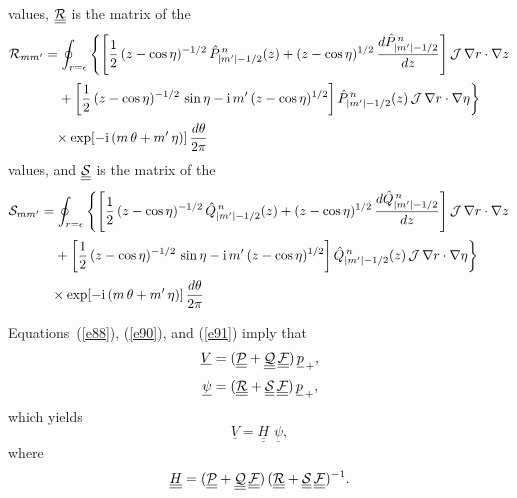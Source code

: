 \documentclass[12pt,prb,aps,notitlepage]{revtex4-1}
\begin{document}
values, $\underline{\underline{{\cal R}}}$ is the matrix of the 
\begin{align}\label{e354}
{\cal R}_{mm'} &=\oint_{r=\epsilon}
\left\{\left[\frac{1}{2}\,(z-\cos\eta)^{-1/2}\,\hat{P}_{|m'|-1/2}^{\,n}(z)+(z-\cos\eta)^{1/2}\,\frac{d\hat{P}_{|m'|-1/2}^{\,n}}{dz}\right]{\cal J}\,\nabla r\cdot \nabla z
\right.\nonumber\\[0.5ex]&
\left.\phantom{=}+\left[\frac{1}{2}\,(z-\cos\eta)^{-1/2}\,\sin\eta-{\rm i}\,m'\,(z-\cos\eta)^{1/2}\right]\hat{P}_{|m'|-1/2}^{\,n}(z)\,{\cal J}\,\nabla r\cdot \nabla \eta
\right\}\nonumber\\[0.5ex] &
\phantom{=}\times\exp[-{\rm i}\,(m\,\theta+m'\,\eta)]\,\frac{d\theta}{2\pi}
\end{align}
values, and 
$\underline{\underline{{\cal S}}}$ is the matrix of the 
\begin{align}
{\cal S}_{mm'} &=\oint_{r=\epsilon}
\left\{\left[\frac{1}{2}\,(z-\cos\eta)^{-1/2}\,\hat{Q}_{|m'|-1/2}^{\,n}(z)+(z-\cos\eta)^{1/2}\,\frac{d\hat{Q}_{|m'|-1/2}^{\,n}}{dz}\right]{\cal J}\,\nabla r\cdot \nabla z
\right.\nonumber\\[0.5ex]&
\left.\phantom{=}+\left[\frac{1}{2}\,(z-\cos\eta)^{-1/2}\,\sin\eta-{\rm i}\,m'\,(z-\cos\eta)^{1/2}\right]\hat{Q}_{|m'|-1/2}^{\,n}(z)\,{\cal J}\,\nabla r\cdot \nabla \eta
\right\}\nonumber\\[0.5ex] &
\phantom{=}\times\exp[-{\rm i}\,(m\,\theta+m'\,\eta)]\,\frac{d\theta}{2\pi}
\end{align}

Equations~(\ref{e88}), (\ref{e90}), and (\ref{e91}) imply that
\begin{align}
\underline{V} &= ( \underline{\underline{\cal P}}+\underline{\underline{\cal Q}}\,\underline{\underline{\cal F}})\,\underline{p}_{\,+},\\[0.5ex]
\underline{\psi} &= ( \underline{\underline{\cal R}}+\underline{\underline{\cal S}}\,\underline{\underline{\cal F}})\,\underline{p}_{\,+},
\end{align}
which yields 
\begin{equation}\label{e105}
\underline{V}= \underline{\underline{H}}\,\,\underline{\psi},
\end{equation}
where
\begin{equation}\label{e106}
\underline{\underline{H}}= (\underline{\underline{\cal P}}+\underline{\underline{\cal Q}}\,\underline{\underline{\cal F}})\,(\underline{\underline{\cal R}}+\underline{\underline{\cal S}}\,\underline{\underline{\cal F}})^{-1}.
\end{equation}
\end{document}
